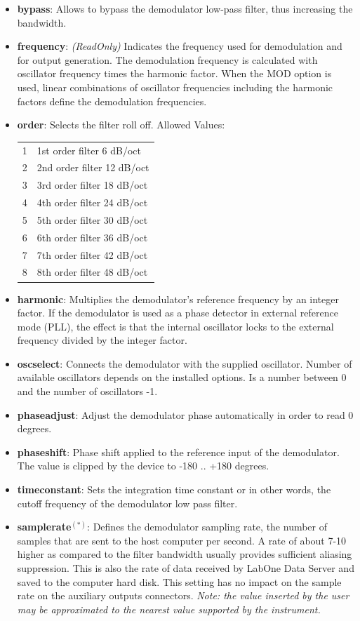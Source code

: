 \documentclass[11pt]{article} %
\begin{document}
	\begin{itemize}
	\item {\bf bypass}: Allows to bypass the demodulator low-pass filter, thus increasing the bandwidth.
	\item {\bf frequency}: {\it (ReadOnly)} Indicates the frequency used for demodulation and for output generation. The demodulation frequency is calculated with oscillator frequency times the harmonic factor. When the MOD option is used, linear combinations of oscillator frequencies including the harmonic factors define the demodulation frequencies.
	\item {\bf order}: Selects the filter roll off. Allowed Values:
	\setlength{\LTleft}{1.5cm}
	\begin{longtable}{p{1cm}p{14cm}}
	1 & 1st order filter 6 dB/oct \\
	2 & 2nd order filter 12 dB/oct \\
	3 & 3rd order filter 18 dB/oct \\
	4 & 4th order filter 24 dB/oct \\
	5 & 5th order filter 30 dB/oct \\
	6 & 6th order filter 36 dB/oct \\
	7 & 7th order filter 42 dB/oct \\
	8 & 8th order filter 48 dB/oct \\
	\end{longtable}
	\item {\bf harmonic}: Multiplies the demodulator's reference frequency by an integer factor. If the demodulator is used as a phase detector in external reference mode (PLL), the effect is that the internal oscillator locks to the external frequency divided by the integer factor.
	\item {\bf oscselect}: Connects the demodulator with the supplied oscillator. Number of available oscillators depends on the installed options. Is a number between 0 and the number of oscillators -1.
	\item {\bf phaseadjust}: Adjust the demodulator phase automatically in order to read 0 degrees.
	\item {\bf phaseshift}: Phase shift applied to the reference input of the demodulator. The value is clipped by the device to -180 .. +180 degrees.
	\item {\bf timeconstant}: Sets the integration time constant or in other words, the cutoff frequency of the demodulator low pass filter.
	\item {\bf samplerate}$^{(*)}$: Defines the demodulator sampling rate, the number of samples that are sent to the host computer per second. A rate of about 7-10 higher as compared to the filter bandwidth usually provides sufficient aliasing suppression. This is also the rate of data received by LabOne Data Server and saved to the computer hard disk. This setting has no impact on the sample rate on the auxiliary outputs connectors. {\it Note: the value inserted by the user may be approximated to the nearest value supported by the instrument.}

\end{itemize}
\end{document}
